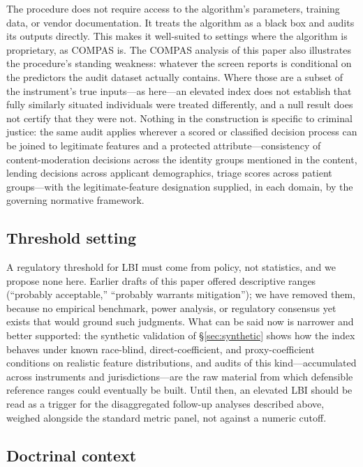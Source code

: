 \documentclass[11pt]{article}
\begin{document}
The procedure does not require access to the algorithm's parameters,
training data, or vendor documentation. It treats the algorithm as a
black box and audits its outputs directly. This makes it well-suited
to settings where the algorithm is proprietary, as COMPAS is. The
COMPAS analysis of this paper also illustrates the procedure's
standing weakness: whatever the screen reports is conditional on the
predictors the audit dataset actually contains. Where those are a
subset of the instrument's true inputs---as here---an elevated index
does not establish that fully similarly situated individuals were
treated differently, and a null result does not certify that they
were not.
Nothing in the construction is specific to criminal justice: the same
audit applies wherever a scored or classified decision process can be
joined to legitimate features and a protected attribute---consistency
of content-moderation decisions across the identity groups mentioned
in the content, lending decisions across applicant demographics,
triage scores across patient groups---with the legitimate-feature
designation supplied, in each domain, by the governing normative
framework.

\subsection{Threshold setting}

A regulatory threshold for LBI must come from policy, not statistics,
and we propose none here. Earlier drafts of this paper offered
descriptive ranges (``probably acceptable,'' ``probably warrants
mitigation''); we have removed them, because no empirical benchmark,
power analysis, or regulatory consensus yet exists that would ground
such judgments. What can be said now is narrower and better
supported: the synthetic validation of \S\ref{sec:synthetic} shows
how the index behaves under known race-blind, direct-coefficient,
and proxy-coefficient conditions on realistic feature distributions,
and audits of this kind---accumulated across instruments and
jurisdictions---are the raw material from which defensible reference
ranges could eventually be built. Until then, an elevated LBI should
be read as a trigger for the disaggregated follow-up analyses
described above, weighed alongside the standard metric panel, not
against a numeric cutoff.

\subsection{Doctrinal context}
\label{sec:doctrine}
\end{document}
